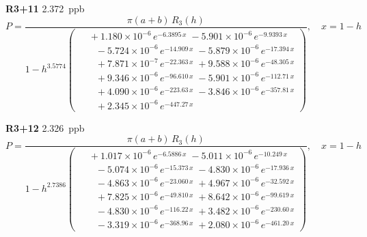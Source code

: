 \documentclass[12pt]{article}
\begin{document}
\noindent\textbf{R3+11} 2.372~ppb\nopagebreak
\begin{equation*}
P = \frac{\pi(a{+}b)\,R_3(h)}{1 - h^{3.5774}\!\left(\!\begin{aligned}
  &\; +1.180{\times}10^{-6}\,e^{-6.3895\,x} \; -5.901{\times}10^{-6}\,e^{-9.9393\,x} \\[-3pt]
  &\quad -5.724{\times}10^{-6}\,e^{-14.909\,x} \; -5.879{\times}10^{-6}\,e^{-17.394\,x} \\[-3pt]
  &\quad +7.871{\times}10^{-7}\,e^{-22.363\,x} \; +9.588{\times}10^{-6}\,e^{-48.305\,x} \\[-3pt]
  &\quad +9.346{\times}10^{-6}\,e^{-96.610\,x} \; -5.901{\times}10^{-6}\,e^{-112.71\,x} \\[-3pt]
  &\quad +4.090{\times}10^{-6}\,e^{-223.63\,x} \; -3.846{\times}10^{-6}\,e^{-357.81\,x} \\[-3pt]
  &\quad +2.345{\times}10^{-6}\,e^{-447.27\,x}
\end{aligned}\!\right)}, \quad x = 1{-}h
\end{equation*}

\noindent\textbf{R3+12} 2.326~ppb\nopagebreak
\begin{equation*}
P = \frac{\pi(a{+}b)\,R_3(h)}{1 - h^{2.7386}\!\left(\!\begin{aligned}
  &\; +1.017{\times}10^{-6}\,e^{-6.5886\,x} \; -5.011{\times}10^{-6}\,e^{-10.249\,x} \\[-3pt]
  &\quad -5.074{\times}10^{-6}\,e^{-15.373\,x} \; -4.830{\times}10^{-6}\,e^{-17.936\,x} \\[-3pt]
  &\quad -4.863{\times}10^{-6}\,e^{-23.060\,x} \; +4.967{\times}10^{-6}\,e^{-32.592\,x} \\[-3pt]
  &\quad +7.825{\times}10^{-6}\,e^{-49.810\,x} \; +8.642{\times}10^{-6}\,e^{-99.619\,x} \\[-3pt]
  &\quad -4.830{\times}10^{-6}\,e^{-116.22\,x} \; +3.482{\times}10^{-6}\,e^{-230.60\,x} \\[-3pt]
  &\quad -3.319{\times}10^{-6}\,e^{-368.96\,x} \; +2.080{\times}10^{-6}\,e^{-461.20\,x}
\end{aligned}\!\right)}, \quad x = 1{-}h
\end{equation*}
\end{document}
